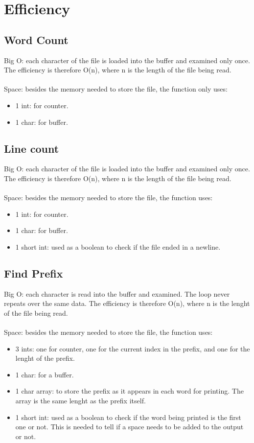 \documentclass[letterpaper,12pt]{article}
\begin{document}
\section{Efficiency}
\subsection{Word Count}
Big O: each character of the file is loaded into the buffer and examined only once. The efficiency is therefore O(n), where n is the length of the file being read. \\ \\
Space: besides the memory needed to store the file, the function only uses: \\
\begin{itemize}
	\item 1 int: for counter.
	\item 1 char: for buffer.
\end{itemize}

\subsection{Line count}
Big O: each character of the file is loaded into the buffer and examined only once. The efficiency is therefore O(n), where n is the length of the file being read. \\ \\
Space: besides the memory needed to store the file, the function uses: \\
\begin{itemize}
	\item 1 int: for counter.
	\item 1 char: for buffer.
	\item 1 short int: used as a boolean to check if the file ended in a newline.
\end{itemize}

\subsection{Find Prefix}
Big O: each character is read into the buffer and examined. The loop never repeats over the same data. The efficiency is therefore O(n), where n is the lenght of the file being read. \\ \\
Space: besides the memory needed to store the file, the function uses:
\begin{itemize}
	\item 3 ints: one for counter, one for the current index in the prefix, and one for the lenght of the prefix.
	\item 1 char: for a buffer.
	\item 1 char array: to store the prefix as it appears in each word for printing. The array is the same lenght as the prefix itself.
	\item 1 short int: used as a boolean to check if the word being printed is the first one or not. This is needed to tell if a space needs to be added to the output or not.
\end{itemize}
\end{document}

